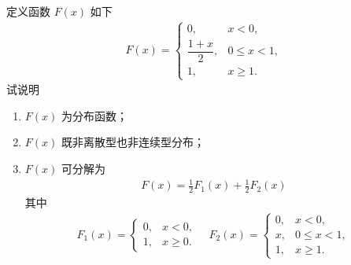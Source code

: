 \documentclass[Prob-All.tex]{subfiles}
\begin{document}
\begin{frame}
	\begin{exam}
		定义函数 $F (x)$ 如下
		\begin{eqnarray*}
			F(x)=\left\{
			\begin{array}{ll}
				0,              & x< 0,      \\
				\dfrac{1+x}{2}, & 0\le x< 1, \\
				1,              & x\ge 1.
			\end{array}
			\right.
		\end{eqnarray*}
		试说明  \begin{enumerate}
			\item $F (x)$ 为分布函数；
			\item $F (x)$ 既非离散型也非连续型分布；
			\item $F (x)$ 可分解为
			      \begin{eqnarray*}
				      F(x)=\frac{1}{2}F_1(x)+\frac{1}{2}F_2(x)
			      \end{eqnarray*}
			      \pause  其中 \begin{eqnarray*}
				      F_1(x)=\left\{
				      \begin{array}{ll}
					      0, & x< 0,    \\
					      1, & x\ge 0.
				      \end{array}
				      \right.
				      \quad  F_2(x)=\left\{\begin{array}{ll}
					      0, & x<0,       \\
					      x, & 0\le x< 1, \\
					      1, & x\ge 1.
				      \end{array}
				      \right.
			      \end{eqnarray*}
		\end{enumerate}

	\end{exam}
\end{frame}
\end{document}
